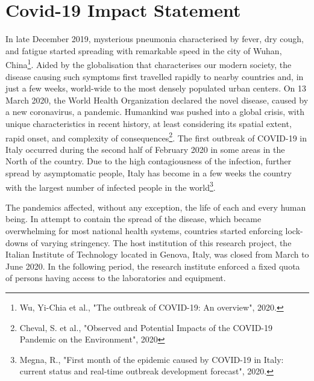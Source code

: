 \newpage
\section*{Covid-19 Impact Statement}

In late December 2019, mysterious pneumonia characterised by fever, dry cough, and fatigue started spreading with remarkable speed in the city of Wuhan, China\footnote{Wu, Yi-Chia et al., "The outbreak of COVID-19: An overview", 2020.}.
%
Aided by the globalisation that characterises our modern society, the disease causing such symptoms first travelled rapidly to nearby countries and, in just a few weeks, world-wide to the most densely populated urban centers.
%
On 13 March 2020, the World Health Organization declared the novel disease, caused by a new coronavirus, a pandemic.
Humankind was pushed into a global crisis, with unique characteristics in recent history, at least considering its spatial extent, rapid onset, and complexity of consequences\footnote{Cheval, S. et al., "Observed and Potential Impacts of the COVID-19 Pandemic on the Environment", 2020}.
%
The first outbreak of COVID-19 in Italy occurred during the second half of February 2020 in some areas in the North of the country.
Due to the high contagiousness of the infection, further spread by asymptomatic people, Italy has become in a few weeks the country with the largest number of infected people in the world\footnote{Megna, R., "First month of the epidemic caused by COVID-19 in Italy: current status and real-time outbreak development forecast", 2020.}.

The pandemics affected, without any exception, the life of each and every human being.
In attempt to contain the spread of the disease, which became overwhelming for most national health systems,  countries started enforcing lock-downs of varying stringency.
The host institution of this research project, the Italian Institute of Technology located in Genova, Italy, was closed from March to June 2020.
In the following period, the research institute enforced a fixed quota of persons having access to the laboratories and equipment.

